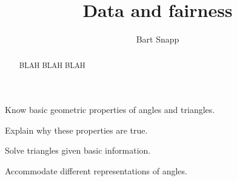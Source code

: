 \documentclass[handout,nooutcomes,noauthor]{../ximera}
\title{Data and fairness}
\author{Bart Snapp}
\begin{document}
\begin{abstract}
  BLAH BLAH BLAH
\end{abstract}
\maketitle


\begin{listSectionOutcomes}
\item Know basic geometric properties of angles and triangles.
\item Explain why these properties are true.
\item Solve triangles given basic information.
\item Accommodate different representations of angles.
\end{listSectionOutcomes}
\end{document}
